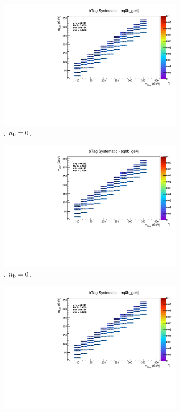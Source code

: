 \begin{figure}[ht!]
\begin{subfigure}[b]{0.32\textwidth}
    \includegraphics[width=\textwidth, page=12]{Figs/sms/t2cc/v37/systs/T2cc_bTag_eq0b_ge4j.pdf}
    \caption{\njhigh, $n_{\text{b}} = 0$.}
  \end{subfigure}
  \begin{subfigure}[b]{0.32\textwidth}
    \includegraphics[width=\textwidth, page=8]{Figs/sms/t2cc/v37/systs/T2cc_bTag_eq0b_ge4j.pdf}
    \caption{\njhigh, $n_{\text{b}} = 0$.}
  \end{subfigure}
  \begin{subfigure}[b]{0.32\textwidth}
    \includegraphics[width=\textwidth, page=1]{Figs/sms/t2cc/v37/systs/T2cc_bTag_eq0b_ge4j.pdf}

\end{subfigure}
\end{figure}
